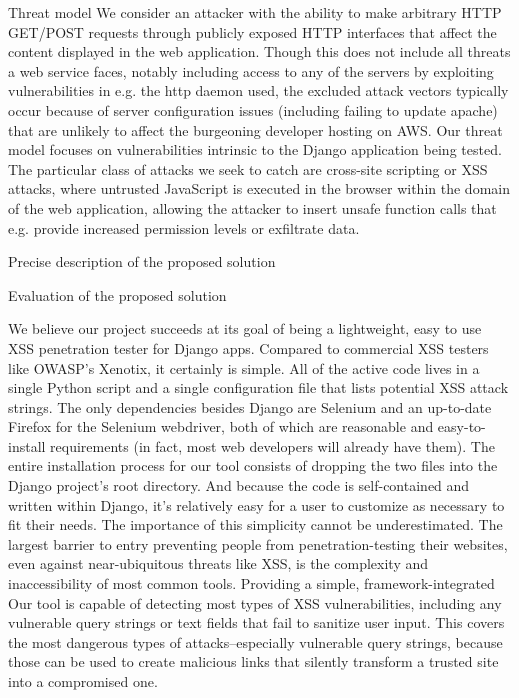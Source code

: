\documentclass{sigplanconf}
\begin{document}
Threat model
We consider an attacker with the ability to make arbitrary HTTP GET/POST requests through publicly exposed HTTP interfaces that affect the content displayed in the web application. Though this does not include all threats a web service faces, notably including access to any of the servers by exploiting vulnerabilities in e.g. the http daemon used, the excluded attack vectors typically occur because of server configuration issues (including failing to update apache) that are unlikely to affect the burgeoning developer hosting on AWS. Our threat model focuses on vulnerabilities intrinsic to the Django application being tested. The particular class of attacks we seek to catch are cross-site scripting or XSS attacks, where untrusted JavaScript is executed in the browser within the domain of the web application, allowing the attacker to insert unsafe function calls that e.g. provide increased permission levels or exfiltrate data.

Precise description of the proposed solution

Evaluation of the proposed solution

We believe our project succeeds at its goal of being a lightweight, easy to use XSS penetration tester for Django apps.  Compared to commercial XSS testers like OWASP's Xenotix, it certainly is simple.  All of the active code lives in a single Python script and a single configuration file that lists potential XSS attack strings.  The only dependencies besides Django are Selenium and an up-to-date Firefox for the Selenium webdriver, both of which are reasonable and easy-to-install requirements (in fact, most web developers will already have them).  The entire installation process for our tool consists of dropping the two files into the Django project's root directory.  And because the code is self-contained and written within Django, it's relatively easy for a user to customize as necessary to fit their needs.  The importance of this simplicity cannot be underestimated.  The largest barrier to entry preventing people from penetration-testing their websites, even against near-ubiquitous threats like XSS, is the complexity and inaccessibility of most common tools.  Providing a simple, framework-integrated 
Our tool is capable of detecting most types of XSS vulnerabilities, including any vulnerable query strings or text fields that fail to sanitize user input.  This covers the most dangerous types of attacks--especially vulnerable query strings, because those can be used to create malicious links that silently transform a trusted site into a compromised one.  
\end{document}
